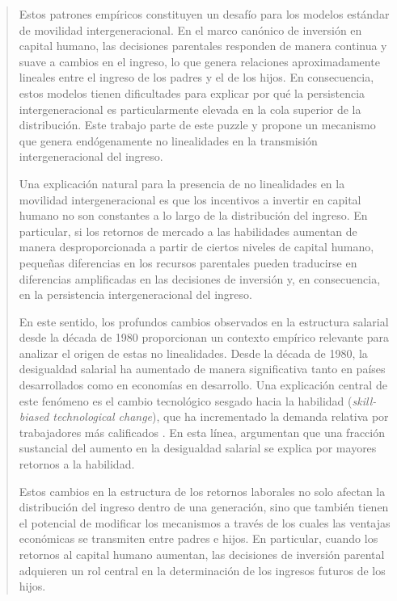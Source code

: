 \documentclass[12pt]{article}
\begin{document}
\begin{abstract}
Estos patrones empíricos constituyen un desafío para los modelos estándar de movilidad intergeneracional\parencite{Becker_Tomes_1979,Solon_1999,Solon_2004}. En el marco canónico de inversión en capital humano, las decisiones parentales responden de manera continua y suave a cambios en el ingreso, lo que genera relaciones aproximadamente lineales entre el ingreso de los padres y el de los hijos. En consecuencia, estos modelos tienen dificultades para explicar por qué la persistencia intergeneracional es particularmente elevada en la cola superior de la distribución. Este trabajo parte de este puzzle y propone un mecanismo que genera endógenamente no linealidades en la transmisión intergeneracional del ingreso.

Una explicación natural para la presencia de no linealidades en la movilidad intergeneracional es que los incentivos a invertir en capital humano no son constantes a lo largo de la distribución del ingreso. En particular, si los retornos de mercado a las habilidades aumentan de manera desproporcionada a partir de ciertos niveles de capital humano, pequeñas diferencias en los recursos parentales pueden traducirse en diferencias amplificadas en las decisiones de inversión y, en consecuencia, en la persistencia intergeneracional del ingreso.

En este sentido, los profundos cambios observados en la estructura salarial desde la década de 1980 proporcionan un contexto empírico relevante para analizar el origen de estas no linealidades. Desde la década de 1980, la desigualdad salarial ha aumentado de manera significativa tanto en países desarrollados como en economías en desarrollo. Una explicación central de este fenómeno es el cambio tecnológico sesgado hacia la habilidad (\emph{skill-biased technological change}), que ha incrementado la demanda relativa por trabajadores más calificados \parencite{Katz_1992,Krusell_2000,Card_2002,Buera_2021}. En esta línea, \textcite{Murphy_1993} argumentan que una fracción sustancial del aumento en la desigualdad salarial se explica por mayores retornos a la habilidad.

Estos cambios en la estructura de los retornos laborales no solo afectan la distribución del ingreso dentro de una generación, sino que también tienen el potencial de modificar los mecanismos a través de los cuales las ventajas económicas se transmiten entre padres e hijos. En particular, cuando los retornos al capital humano aumentan, las decisiones de inversión parental adquieren un rol central en la determinación de los ingresos futuros de los hijos.


\end{abstract}
\end{document}
